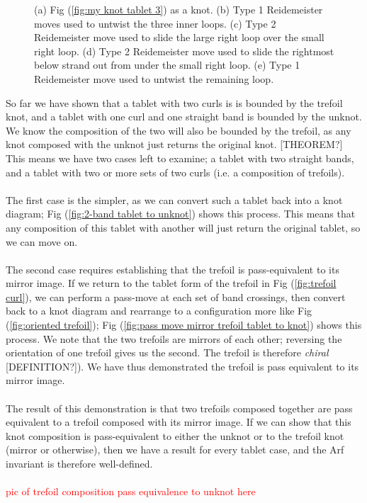 \documentclass{article}
\begin{document}
{\begin{figure}
\begin{subfigure}{0.3\linewidth}
 \label{fig:pass eq 52 5}
 \caption{}
 \end{subfigure}
 \caption{(a) Fig (\ref{fig:my knot tablet 3}) as a knot. (b) Type 1 Reidemeister moves used to untwist the three inner loops. (c) Type 2 Reidemeister move used to slide the large right loop over the small right loop. (d) Type 2 Reidemeister move used to slide the rightmost below strand out from under the small right loop. (e) Type 1 Reidemeister move used to untwist the remaining loop.}
\label{fig:passeq52}
\end{figure}

So far we have shown that a tablet with two curls is is bounded by the trefoil knot, and a tablet with one curl and one straight band is bounded by the unknot. We know the composition of the two will also be bounded by the trefoil, as any knot composed with the unknot just returns the original knot. [THEOREM?] This means we have two cases left to examine; a tablet with two straight bands, and a tablet with two or more sets of two curls (i.e. a composition of trefoils).\\
\\
The first case is the simpler, as we can convert such a tablet back into a knot diagram; Fig (\ref{fig:2-band tablet to unknot}) shows this process. This means that any composition of this tablet with another will just return the original tablet, so we can move on.\\
\\
The second case requires establishing that the trefoil is pass-equivalent to its mirror image. If we return to the tablet form of the trefoil in Fig (\ref{fig:trefoil curl}), we can perform a pass-move at each set of band crossings, then convert back to a knot diagram and rearrange to a configuration more like Fig (\ref{fig:oriented trefoil}); Fig (\ref{fig:pass move mirror trefoil tablet to knot}) shows this process. We note that the two trefoils are mirrors of each other; reversing the orientation of one trefoil gives us the second. The trefoil is therefore \emph{chiral} [DEFINITION?]). We have thus demonstrated the trefoil is pass equivalent to its mirror image.\\
\\
The result of this demonstration is that two trefoils composed together are pass equivalent to a trefoil composed with its mirror image. If we can show that this knot composition is pass-equivalent to either the unknot or to the trefoil knot (mirror or otherwise), then we have a result for every tablet case, and the Arf invariant is therefore well-defined.\\
\\
\textcolor{red}{pic of trefoil composition pass equivalence to unknot here}

}
\end{document}

